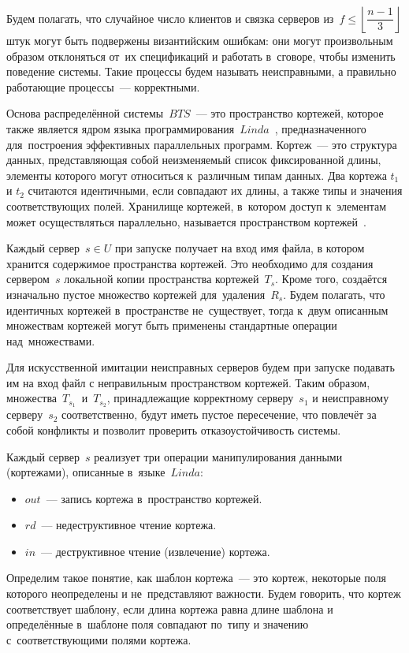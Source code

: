 Будем полагать, что случайное число клиентов и связка серверов из~$f \leqslant \left\lfloor \dfrac{n-1}{3} \right\rfloor$ штук могут быть подвержены византийским ошибкам: они могут произвольным образом отклоняться от~их спецификаций и работать в~сговоре, чтобы изменить поведение системы. Такие процессы будем называть неисправными, а правильно работающие процессы~--- корректными.

Основа распределённой системы~$BTS$~--- это пространство кортежей, которое также является ядром языка программирования~$Linda$~\autocite{linda}, предназначенного для~построения эффективных параллельных программ. Кортеж~--- это структура данных, представляющая собой неизменяемый список фиксированной длины, элементы которого могут относиться к~различным типам данных. Два кортежа $t_1$ и $t_2$ считаются идентичными, если совпадают их длины, а также типы и значения соответствующих полей. Хранилище кортежей, в~котором доступ к~элементам может осуществляться параллельно, называется пространством кортежей~\autocite{tuplespace}.

Каждый сервер~$s \in U$ при запуске получает на вход имя файла, в котором хранится содержимое пространства кортежей. Это необходимо для создания сервером~$s$ локальной копии пространства кортежей~$T_s$. Кроме того, создаётся изначально пустое множество кортежей для~удаления~$R_s$. Будем полагать, что идентичных кортежей в~пространстве не~существует, тогда к~двум описанным множествам кортежей могут быть применены стандартные операции над~множествами.

Для искусственной имитации неисправных серверов будем при запуске подавать им на вход файл с неправильным пространством кортежей. Таким образом, множества~$T_{s_1}$~и~$T_{s_2}$, принадлежащие корректному серверу~$s_1$ и неисправному серверу~$s_2$ соответственно, будут иметь пустое пересечение, что повлечёт за собой конфликты и позволит проверить отказоустойчивость системы.

Каждый сервер~$s$ реализует три операции манипулирования данными (кортежами), описанные в~языке~$Linda$:
\begin{itemize}
	\item $out$~--- запись кортежа в~пространство кортежей.
	\item $rd$~--- недеструктивное чтение кортежа.
	\item $in$~--- деструктивное чтение (извлечение) кортежа.
\end{itemize}
Определим такое понятие, как шаблон кортежа~--- это кортеж, некоторые поля которого неопределены и не~представляют важности. Будем говорить, что кортеж соответствует шаблону, если длина кортежа равна длине шаблона и определённые в~шаблоне поля совпадают по~типу и значению с~соответствующими полями кортежа.


